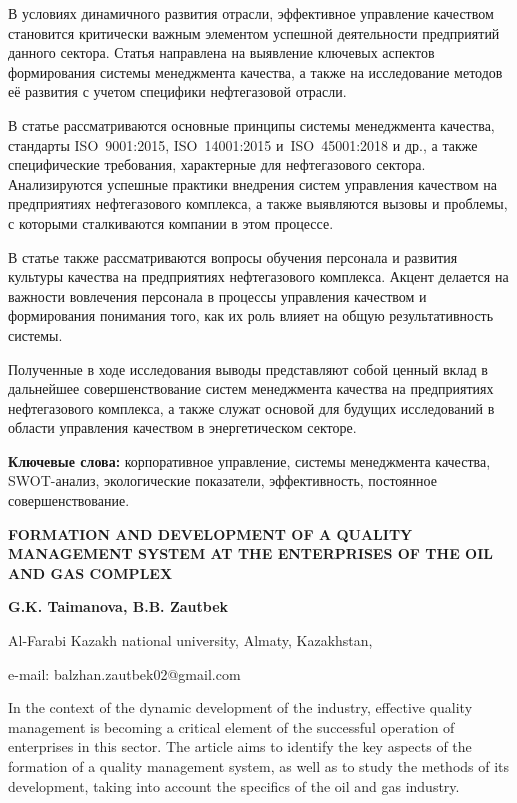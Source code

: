 В условиях динамичного развития отрасли, эффективное управление
качеством становится критически важным элементом успешной деятельности
предприятий данного сектора. Статья направлена на выявление ключевых
аспектов формирования системы менеджмента качества, а также на
исследование методов её развития с учетом специфики нефтегазовой
отрасли.

В статье рассматриваются основные принципы системы менеджмента качества,
стандарты ISO~9001:2015, ISO~14001:2015 и~ISO~45001:2018 и др., а также
специфические требования, характерные для нефтегазового сектора.
Анализируются успешные практики внедрения систем управления качеством на
предприятиях нефтегазового комплекса, а также выявляются вызовы и
проблемы, с которыми сталкиваются компании в этом процессе.

В статье также рассматриваются вопросы обучения персонала и развития
культуры качества на предприятиях нефтегазового комплекса. Акцент
делается на важности вовлечения персонала в процессы управления
качеством и формирования понимания того, как их роль влияет на общую
результативность системы.

Полученные в ходе исследования выводы представляют собой ценный вклад в
дальнейшее совершенствование систем менеджмента качества на предприятиях
нефтегазового комплекса, а также служат основой для будущих исследований
в области управления качеством в энергетическом секторе.

{\bfseries Ключевые слова:} корпоративное управление, системы менеджмента
качества, SWOT-анализ, экологические показатели, эффективность,
постоянное совершенствование.

\begin{center}
{\large\bfseries FORMATION AND DEVELOPMENT OF A QUALITY MANAGEMENT SYSTEM AT THE
ENTERPRISES OF THE OIL AND GAS COMPLEX}

{\bfseries G.K. Taimanova, B.B. Zautbek\envelope}

Al-Farabi Kazakh national university, Almaty, Kazakhstan,

e-mail: balzhan.zautbek02@gmail.com
\end{center}

In the context of the dynamic development of the industry, effective
quality management is becoming a critical element of the successful
operation of enterprises in this sector. The article aims to identify
the key aspects of the formation of a quality management system, as well
as to study the methods of its development, taking into account the
specifics of the oil and gas industry.

